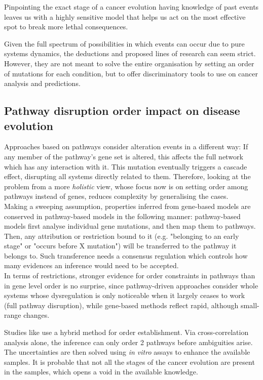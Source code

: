 Pinpointing the exact stage of a cancer evolution having knowledge of past events leaves us with a highly sensitive model that helps us act on the most effective spot to break more lethal consequences.

Given the full spectrum of possibilities in which events can occur due to pure systems dynamics, the deductions and proposed lines of research can seem strict. However, they are not meant to solve the entire organisation by setting an order of mutations for each condition, but to offer discriminatory tools to use on cancer analysis and predictions.

\subsection{Pathway disruption order impact on disease evolution}
Approaches based on pathways consider alteration events in a different way: If any member of the pathway's gene set is altered, this affects the full network which has any interaction with it. This mutation eventually triggers a cascade effect, disrupting all systems directly related to them. Therefore, looking at the problem from a more \textit{holistic} view, whose focus now is on setting order among pathways instead of genes, reduces complexity by generalising the cases.
\\

Making a sweeping assumption, properties inferred from gene-based models are conserved in pathway-based models in the following manner: pathway-based models first analyse individual gene mutations, and then map them to pathways. Then, any attribution or restriction bound to it (e.g. "belonging to an early stage" or "occurs before X mutation") will be transferred to the pathway it belongs to. Such transference needs a consensus regulation which controls how many evidences an inference would need to be accepted.
\\

In terms of restrictions, stronger evidence for order constraints in pathways than in gene level order is no surprise, since pathway-driven approaches consider whole systems whose dysregulation is only noticeable when it largely ceases to work (full pathway disruption), while gene-based methods reflect rapid, although small-range changes.

Studies like \cite{Cheng2012AGliomagenesis} use a hybrid method for order establishment. Via cross-correlation analysis alone, the inference can only order 2 pathways before ambiguities arise. The uncertainties are then solved using \emph{in vitro} assays to enhance the available samples. It is probable that not all the stages of the cancer evolution are present in the samples, which opens a void in the available knowledge.

